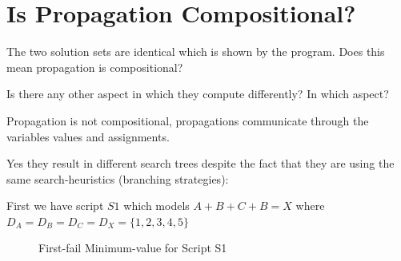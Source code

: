 \documentclass[a4paper, 11pt]{article}
\begin{document}
\section{Is Propagation Compositional?}
The two solution sets are identical which is shown by the program. Does this mean propagation is compositional?

Is there any other aspect in which they compute differently? In which aspect?

Propagation is not compositional, propagations communicate through the variables values and assignments. 

Yes they result in different search trees despite the fact that they are using the same search-heuristics (branching strategies):

First we have script $S1$ which models $A+B+C+B = X$ where $D_A = D_B = D_C = D_X = \{1,2,3,4,5\}$
\begin{figure}[H]
  \begin{center}
    \caption{First-fail Minimum-value for Script S1}
    \label{fig:ffvms1}
  \end{center}
\end{figure}
\end{document}
